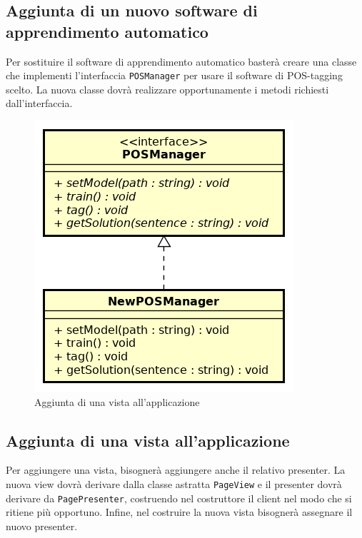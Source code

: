\subsection{Aggiunta di un nuovo software di apprendimento automatico}
Per sostituire il software di apprendimento automatico basterà creare una classe che implementi l'interfaccia \texttt{POSManager} per usare il software di POS-tagging scelto. La nuova classe dovrà realizzare opportunamente i metodi richiesti dall'interfaccia.\\
\vspace*{3em}

\begin{figure}[ht]
	\centering
	\includegraphics[scale=0.80]{images/newPOS.png}
	\caption{Aggiunta di una vista all'applicazione}
\end{figure}
\newpage

\subsection{Aggiunta di una vista all'applicazione}
Per aggiungere una vista, bisognerà aggiungere anche il relativo presenter. La nuova view dovrà derivare dalla classe astratta \texttt{PageView} e il presenter dovrà derivare da \texttt{PagePresenter}, costruendo nel costruttore il client nel modo che si ritiene più opportuno. Infine, nel costruire la nuova vista bisognerà assegnare il nuovo presenter.\\
\vspace*{3em}


